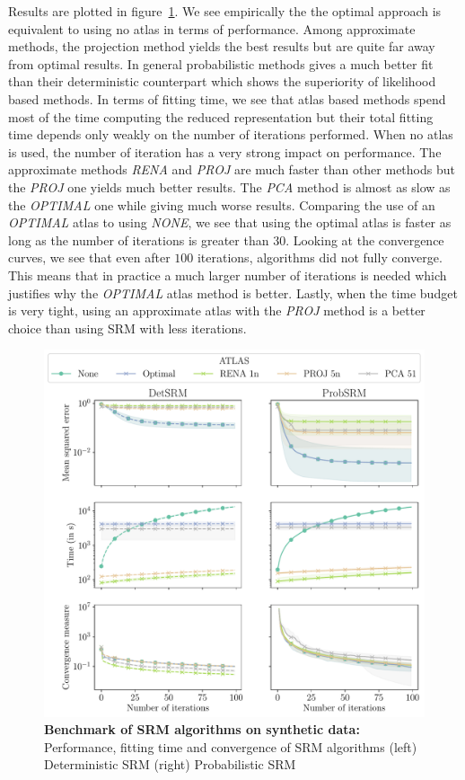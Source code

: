 Results are plotted in figure~\ref{fig:srm:synthetic_gradient}. 
We see empirically the the optimal approach is equivalent to using no atlas in
terms of performance. Among approximate methods, the projection
method yields the best results but are quite far away from optimal results.
In general probabilistic methods gives a much better fit than their deterministic
counterpart which shows the superiority of likelihood based methods.
In terms of fitting time, we see that atlas based methods spend most of the time
computing the reduced representation but their total fitting time depends only
weakly on the number of iterations performed. When no atlas is used, the number
of iteration has a very strong impact on performance. The approximate methods
\emph{RENA} and \emph{PROJ} are much faster than other methods but
the \emph{PROJ} one yields much better results. The \emph{PCA} method is
almost as slow as the \emph{OPTIMAL} one while giving much worse results.
Comparing the use of an \emph{OPTIMAL} atlas to using \emph{NONE}, we see that
using the optimal atlas is faster as long as the number of iterations is greater
than $30$.
Looking at the convergence curves, we see that even after $100$ iterations, algorithms did
not fully converge. This means that in practice a much larger number of
iterations is needed which justifies why the \emph{OPTIMAL} atlas method is better.
Lastly, when the time budget is very tight, using an approximate atlas with the
\emph{PROJ} method is a better choice than
using SRM with less iterations. 

\begin{figure}
  \centering
  \includegraphics[width=\textwidth]{figures/srm/synthetic_gradient.pdf}
  \caption{\textbf{Benchmark of SRM algorithms on synthetic data: } Performance,
    fitting time and convergence of SRM algorithms (left) Deterministic SRM
    (right) Probabilistic SRM}
  \label{fig:srm:synthetic_gradient}
\end{figure}





